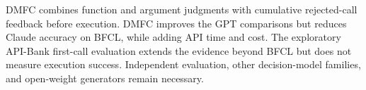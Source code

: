 DMFC combines function and argument judgments with cumulative rejected-call feedback before execution. DMFC improves the GPT comparisons but reduces Claude accuracy on BFCL, while adding API time and cost. The exploratory API-Bank first-call evaluation extends the evidence beyond BFCL but does not measure execution success. Independent evaluation, other decision-model families, and open-weight generators remain necessary.
